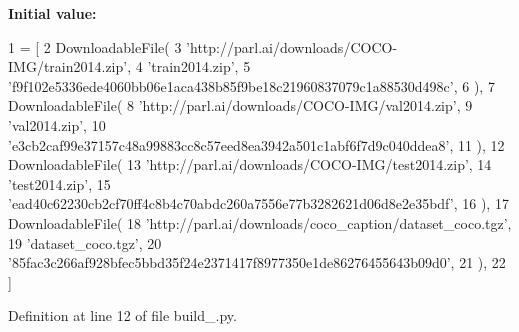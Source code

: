 {\bfseries Initial value\+:}
\begin{DoxyCode}
1 =  [
2     DownloadableFile(
3         \textcolor{stringliteral}{'http://parl.ai/downloads/COCO-IMG/train2014.zip'},
4         \textcolor{stringliteral}{'train2014.zip'},
5         \textcolor{stringliteral}{'f9f102e5336ede4060bb06e1aca438b85f9be18c21960837079c1a88530d498c'},
6     ),
7     DownloadableFile(
8         \textcolor{stringliteral}{'http://parl.ai/downloads/COCO-IMG/val2014.zip'},
9         \textcolor{stringliteral}{'val2014.zip'},
10         \textcolor{stringliteral}{'e3cb2caf99e37157c48a99883cc8c57eed8ea3942a501c1abf6f7d9c040ddea8'},
11     ),
12     DownloadableFile(
13         \textcolor{stringliteral}{'http://parl.ai/downloads/COCO-IMG/test2014.zip'},
14         \textcolor{stringliteral}{'test2014.zip'},
15         \textcolor{stringliteral}{'ead40c62230cb2cf70ff4c8b4c70abdc260a7556e77b3282621d06d8e2e35bdf'},
16     ),
17     DownloadableFile(
18         \textcolor{stringliteral}{'http://parl.ai/downloads/coco\_caption/dataset\_coco.tgz'},
19         \textcolor{stringliteral}{'dataset\_coco.tgz'},
20         \textcolor{stringliteral}{'85fac3c266af928bfec5bbd35f24e2371417f8977350e1de86276455643b09d0'},
21     ),
22 ]
\end{DoxyCode}


Definition at line 12 of file build\+\_.\+py.

